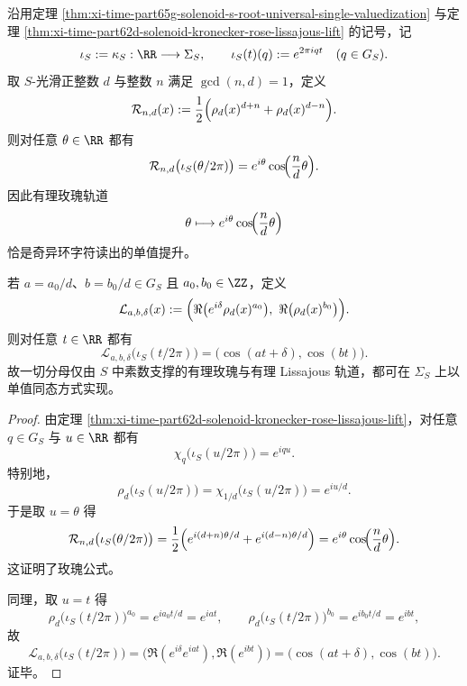 \begin{corollary}\label{cor:xi-time-part65g-rose-lissajous-singular-ring-homomorphic-lift}
沿用定理 \ref{thm:xi-time-part65g-solenoid-s-root-universal-single-valuedization} 与定理 \ref{thm:xi-time-part62d-solenoid-kronecker-rose-lissajous-lift} 的记号，记
\[
\iota_S:=\kappa_S:\RR\longrightarrow \Sigma_S,
\qquad
\iota_S(t)(q):=e^{2\pi iqt}
\quad (q\in G_S).
\]
取 \(S\)-光滑正整数 \(d\) 与整数 \(n\) 满足 \(\gcd(n,d)=1\)，定义
\[
\mathcal R_{n,d}(x):=\frac12\Bigl(\rho_d(x)^{d+n}+\rho_d(x)^{d-n}\Bigr).
\]
则对任意 \(\theta\in\RR\) 都有
\[
\mathcal R_{n,d}\bigl(\iota_S(\theta/2\pi)\bigr)
=
e^{i\theta}\cos\!\Bigl(\frac{n}{d}\theta\Bigr).
\]
因此有理玫瑰轨道
\[
\theta\longmapsto e^{i\theta}\cos\!\Bigl(\frac{n}{d}\theta\Bigr)
\]
恰是奇异环字符读出的单值提升。

若 \(a=a_0/d\)、\(b=b_0/d\in G_S\) 且 \(a_0,b_0\in\ZZ\)，定义
\[
\mathcal L_{a,b,\delta}(x):=
\Bigl(
\Re\bigl(e^{i\delta}\rho_d(x)^{a_0}\bigr),\
\Re\bigl(\rho_d(x)^{b_0}\bigr)
\Bigr).
\]
则对任意 \(t\in\RR\) 都有
\[
\mathcal L_{a,b,\delta}\bigl(\iota_S(t/2\pi)\bigr)
=
\bigl(\cos(at+\delta),\cos(bt)\bigr).
\]
故一切分母仅由 \(S\) 中素数支撑的有理玫瑰与有理 Lissajous 轨道，都可在 \(\Sigma_S\) 上以单值同态方式实现。
\end{corollary}
\begin{proof}
由定理 \ref{thm:xi-time-part62d-solenoid-kronecker-rose-lissajous-lift}，对任意 \(q\in G_S\) 与 \(u\in\RR\) 都有
\[
\chi_q\bigl(\iota_S(u/2\pi)\bigr)=e^{iqu}.
\]
特别地，
\[
\rho_d\bigl(\iota_S(u/2\pi)\bigr)=\chi_{1/d}\bigl(\iota_S(u/2\pi)\bigr)=e^{iu/d}.
\]
于是取 \(u=\theta\) 得
\[
\mathcal R_{n,d}\bigl(\iota_S(\theta/2\pi)\bigr)
=
\frac12\Bigl(
e^{i(d+n)\theta/d}+e^{i(d-n)\theta/d}
\Bigr)
=
e^{i\theta}\cos\!\Bigl(\frac{n}{d}\theta\Bigr).
\]
这证明了玫瑰公式。

同理，取 \(u=t\) 得
\[
\rho_d\bigl(\iota_S(t/2\pi)\bigr)^{a_0}=e^{ia_0t/d}=e^{iat},
\qquad
\rho_d\bigl(\iota_S(t/2\pi)\bigr)^{b_0}=e^{ib_0t/d}=e^{ibt},
\]
故
\[
\mathcal L_{a,b,\delta}\bigl(\iota_S(t/2\pi)\bigr)
=
\bigl(\Re(e^{i\delta}e^{iat}),\Re(e^{ibt})\bigr)
=
\bigl(\cos(at+\delta),\cos(bt)\bigr).
\]
证毕。
\end{proof}

